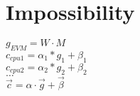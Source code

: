 \section{Impossibility}
\label{sec:impossibility}

$g_{EVM}=W\cdot M$\\
$c_{cpu1}=\alpha_1*g_1+\beta_1$\\
$c_{cpu2}=\alpha_2*g_2+\beta_2$\\
$\dots$\\
$\vec{c}=\alpha\cdot \vec{g} + \vec{\beta}$